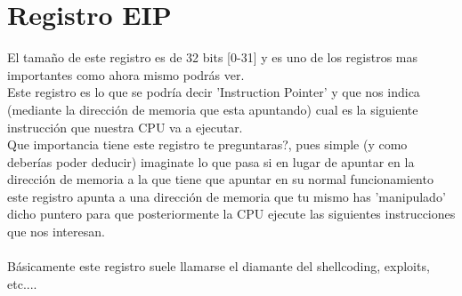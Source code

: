 \documentclass{fennix}
\begin{document}
\newpage
\section{Registro EIP}
El tamaño de este registro es de 32 bits [0-31] y es uno de los registros mas importantes como ahora mismo podrás ver.\\
Este registro es lo que se podría decir 'Instruction Pointer' y que nos indica (mediante la dirección de memoria que esta apuntando) cual es la siguiente instrucción que nuestra CPU va a ejecutar.\\
Que importancia tiene este registro te preguntaras?, pues simple (y como deberías poder deducir) imaginate lo que pasa si en lugar de apuntar en la dirección de memoria a la que tiene que apuntar en su normal funcionamiento este registro apunta a una dirección de memoria que tu mismo has 'manipulado' dicho puntero para que posteriormente la CPU ejecute las siguientes instrucciones que nos interesan.\\
\\
Básicamente este registro suele llamarse el diamante del shellcoding, exploits, etc....\\

\newpage
\end{document}
